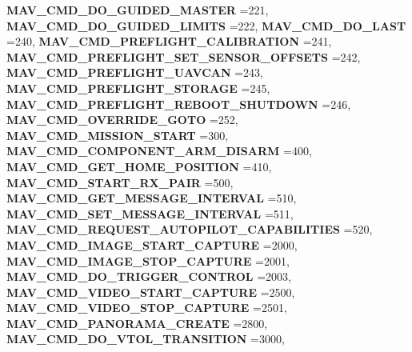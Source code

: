 \begin{DoxyCompactItemize}
\textbf{ M\+A\+V\+\_\+\+C\+M\+D\+\_\+\+D\+O\+\_\+\+G\+U\+I\+D\+E\+D\+\_\+\+M\+A\+S\+T\+ER} =221, 
\newline
\textbf{ M\+A\+V\+\_\+\+C\+M\+D\+\_\+\+D\+O\+\_\+\+G\+U\+I\+D\+E\+D\+\_\+\+L\+I\+M\+I\+TS} =222, 
\textbf{ M\+A\+V\+\_\+\+C\+M\+D\+\_\+\+D\+O\+\_\+\+L\+A\+ST} =240, 
\textbf{ M\+A\+V\+\_\+\+C\+M\+D\+\_\+\+P\+R\+E\+F\+L\+I\+G\+H\+T\+\_\+\+C\+A\+L\+I\+B\+R\+A\+T\+I\+ON} =241, 
\textbf{ M\+A\+V\+\_\+\+C\+M\+D\+\_\+\+P\+R\+E\+F\+L\+I\+G\+H\+T\+\_\+\+S\+E\+T\+\_\+\+S\+E\+N\+S\+O\+R\+\_\+\+O\+F\+F\+S\+E\+TS} =242, 
\newline
\textbf{ M\+A\+V\+\_\+\+C\+M\+D\+\_\+\+P\+R\+E\+F\+L\+I\+G\+H\+T\+\_\+\+U\+A\+V\+C\+AN} =243, 
\textbf{ M\+A\+V\+\_\+\+C\+M\+D\+\_\+\+P\+R\+E\+F\+L\+I\+G\+H\+T\+\_\+\+S\+T\+O\+R\+A\+GE} =245, 
\textbf{ M\+A\+V\+\_\+\+C\+M\+D\+\_\+\+P\+R\+E\+F\+L\+I\+G\+H\+T\+\_\+\+R\+E\+B\+O\+O\+T\+\_\+\+S\+H\+U\+T\+D\+O\+WN} =246, 
\textbf{ M\+A\+V\+\_\+\+C\+M\+D\+\_\+\+O\+V\+E\+R\+R\+I\+D\+E\+\_\+\+G\+O\+TO} =252, 
\newline
\textbf{ M\+A\+V\+\_\+\+C\+M\+D\+\_\+\+M\+I\+S\+S\+I\+O\+N\+\_\+\+S\+T\+A\+RT} =300, 
\textbf{ M\+A\+V\+\_\+\+C\+M\+D\+\_\+\+C\+O\+M\+P\+O\+N\+E\+N\+T\+\_\+\+A\+R\+M\+\_\+\+D\+I\+S\+A\+RM} =400, 
\textbf{ M\+A\+V\+\_\+\+C\+M\+D\+\_\+\+G\+E\+T\+\_\+\+H\+O\+M\+E\+\_\+\+P\+O\+S\+I\+T\+I\+ON} =410, 
\textbf{ M\+A\+V\+\_\+\+C\+M\+D\+\_\+\+S\+T\+A\+R\+T\+\_\+\+R\+X\+\_\+\+P\+A\+IR} =500, 
\newline
\textbf{ M\+A\+V\+\_\+\+C\+M\+D\+\_\+\+G\+E\+T\+\_\+\+M\+E\+S\+S\+A\+G\+E\+\_\+\+I\+N\+T\+E\+R\+V\+AL} =510, 
\textbf{ M\+A\+V\+\_\+\+C\+M\+D\+\_\+\+S\+E\+T\+\_\+\+M\+E\+S\+S\+A\+G\+E\+\_\+\+I\+N\+T\+E\+R\+V\+AL} =511, 
\textbf{ M\+A\+V\+\_\+\+C\+M\+D\+\_\+\+R\+E\+Q\+U\+E\+S\+T\+\_\+\+A\+U\+T\+O\+P\+I\+L\+O\+T\+\_\+\+C\+A\+P\+A\+B\+I\+L\+I\+T\+I\+ES} =520, 
\textbf{ M\+A\+V\+\_\+\+C\+M\+D\+\_\+\+I\+M\+A\+G\+E\+\_\+\+S\+T\+A\+R\+T\+\_\+\+C\+A\+P\+T\+U\+RE} =2000, 
\newline
\textbf{ M\+A\+V\+\_\+\+C\+M\+D\+\_\+\+I\+M\+A\+G\+E\+\_\+\+S\+T\+O\+P\+\_\+\+C\+A\+P\+T\+U\+RE} =2001, 
\textbf{ M\+A\+V\+\_\+\+C\+M\+D\+\_\+\+D\+O\+\_\+\+T\+R\+I\+G\+G\+E\+R\+\_\+\+C\+O\+N\+T\+R\+OL} =2003, 
\textbf{ M\+A\+V\+\_\+\+C\+M\+D\+\_\+\+V\+I\+D\+E\+O\+\_\+\+S\+T\+A\+R\+T\+\_\+\+C\+A\+P\+T\+U\+RE} =2500, 
\textbf{ M\+A\+V\+\_\+\+C\+M\+D\+\_\+\+V\+I\+D\+E\+O\+\_\+\+S\+T\+O\+P\+\_\+\+C\+A\+P\+T\+U\+RE} =2501, 
\newline
\textbf{ M\+A\+V\+\_\+\+C\+M\+D\+\_\+\+P\+A\+N\+O\+R\+A\+M\+A\+\_\+\+C\+R\+E\+A\+TE} =2800, 
\textbf{ M\+A\+V\+\_\+\+C\+M\+D\+\_\+\+D\+O\+\_\+\+V\+T\+O\+L\+\_\+\+T\+R\+A\+N\+S\+I\+T\+I\+ON} =3000, 

\end{DoxyCompactItemize}
